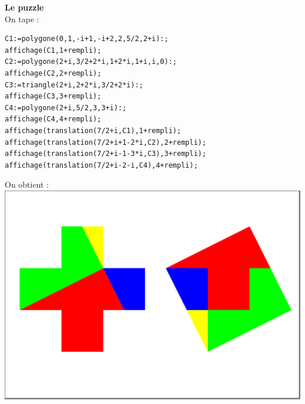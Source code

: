 \documentclass[a4paper,11pt]{book}
\begin{document}
{\bf Le puzzle}\\
On tape :
\begin{verbatim}
C1:=polygone(0,1,-i+1,-i+2,2,5/2,2+i):;
affichage(C1,1+rempli);
C2:=polygone(2+i,3/2+2*i,1+2*i,1+i,i,0):;
affichage(C2,2+rempli);
C3:=triangle(2+i,2+2*i,3/2+2*i):;
affichage(C3,3+rempli);
C4:=polygone(2+i,5/2,3,3+i):;
affichage(C4,4+rempli);
affichage(translation(7/2+i,C1),1+rempli);
affichage(translation(7/2+i+1-2*i,C2),2+rempli);
affichage(translation(7/2+i-1-3*i,C3),3+rempli);
affichage(translation(7/2+i-2-i,C4),4+rempli);
\end{verbatim}
On obtient :\\
\includegraphics[width=\textwidth]{puzzlecroix2}
\end{document}
